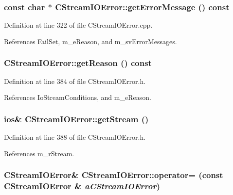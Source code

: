 \subsubsection{\setlength{\rightskip}{0pt plus 5cm}const char $\ast$ CStream\-IOError::get\-Error\-Message () const}\label{classCStreamIOError_a7}




Definition at line 322 of file CStream\-IOError.cpp.

References Fail\-Set, m\_\-e\-Reason, and m\_\-sv\-Error\-Messages.
\subsubsection{ CStream\-IOError::get\-Reason () const\hspace{0.3cm}{\tt  [inline]}}\label{classCStreamIOError_a5}




Definition at line 384 of file CStream\-IOError.h.

References Io\-Stream\-Conditions, and m\_\-e\-Reason.
\subsubsection{\setlength{\rightskip}{0pt plus 5cm}ios\& CStream\-IOError::get\-Stream ()\hspace{0.3cm}{\tt  [inline]}}\label{classCStreamIOError_a6}




Definition at line 388 of file CStream\-IOError.h.

References m\_\-r\-Stream.
\subsubsection{\setlength{\rightskip}{0pt plus 5cm}CStream\-IOError\& CStream\-IOError::operator= (const CStream\-IOError \& {\em a\-CStream\-IOError})\hspace{0.3cm}{\tt  [private]}}\label{classCStreamIOError_c0}


